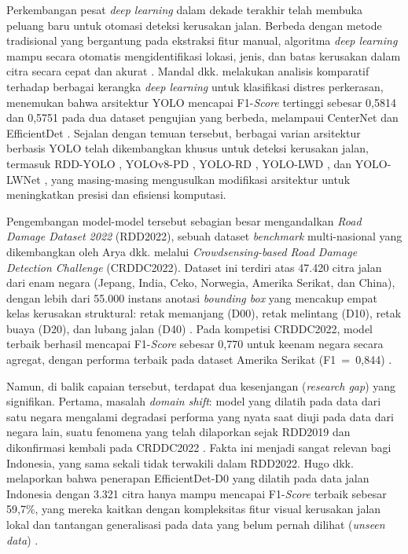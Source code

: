 Perkembangan pesat \textit{deep learning} dalam dekade terakhir telah membuka peluang baru
untuk otomasi deteksi kerusakan jalan. Berbeda dengan metode tradisional yang bergantung pada
ekstraksi fitur manual, algoritma \textit{deep learning} mampu secara otomatis mengidentifikasi
lokasi, jenis, dan batas kerusakan dalam citra secara cepat dan akurat \cite{Zeng2024}.
Mandal dkk. melakukan analisis komparatif terhadap berbagai kerangka
\textit{deep learning} untuk klasifikasi distres perkerasan, menemukan bahwa arsitektur
YOLO mencapai F1-\textit{Score} tertinggi sebesar 0,5814 dan 0,5751 pada dua dataset
pengujian yang berbeda, melampaui CenterNet dan EfficientDet \cite{mandal2020deep}.
Sejalan dengan temuan tersebut, berbagai varian arsitektur berbasis YOLO telah dikembangkan khusus untuk
deteksi kerusakan jalan, termasuk RDD-YOLO \cite{Li2024}, YOLOv8-PD \cite{Zeng2024},
YOLO-RD \cite{Wang2025}, YOLO-LWD \cite{Shi_2026}, dan YOLO-LWNet \cite{Wu2023},
yang masing-masing mengusulkan modifikasi arsitektur untuk meningkatkan presisi dan efisiensi
komputasi.

Pengembangan model-model tersebut sebagian besar mengandalkan \textit{Road Damage Dataset
  2022} (RDD2022), sebuah dataset \textit{benchmark} multi-nasional yang dikembangkan oleh
Arya dkk. melalui \textit{Crowdsensing-based Road Damage Detection Challenge}
(CRDDC2022). Dataset ini terdiri atas 47.420 citra jalan dari enam negara (Jepang, India,
Ceko, Norwegia, Amerika Serikat, dan China), dengan lebih dari 55.000 instans anotasi
\textit{bounding box} yang mencakup empat kelas kerusakan struktural: retak memanjang (D00),
retak melintang (D10), retak buaya (D20), dan lubang jalan (D40) \cite{Arya2024846}. Pada
kompetisi CRDDC2022, model terbaik berhasil mencapai F1-\textit{Score} sebesar 0,770 untuk
keenam negara secara agregat, dengan performa terbaik pada dataset Amerika Serikat
(F1~=~0,844) \cite{Arya2024846}.

Namun, di balik capaian tersebut, terdapat dua kesenjangan (\textit{research gap}) yang signifikan. Pertama, masalah \textit{domain shift}: model yang dilatih pada data dari satu negara mengalami degradasi performa yang nyata saat diuji pada data dari negara lain, suatu fenomena yang telah dilaporkan sejak RDD2019 dan dikonfirmasi kembali pada CRDDC2022 \cite{Arya2024846}. Fakta ini menjadi sangat relevan bagi Indonesia, yang sama sekali tidak terwakili dalam RDD2022. Hugo dkk. melaporkan bahwa penerapan EfficientDet-D0 yang dilatih pada data jalan Indonesia dengan 3.321 citra hanya mampu mencapai F1-\textit{Score} terbaik sebesar 59{,}7\%, yang mereka kaitkan dengan kompleksitas fitur visual kerusakan jalan lokal dan tantangan generalisasi pada data yang belum pernah dilihat (\textit{unseen data}) \cite{hugo2025efficientdet}.

